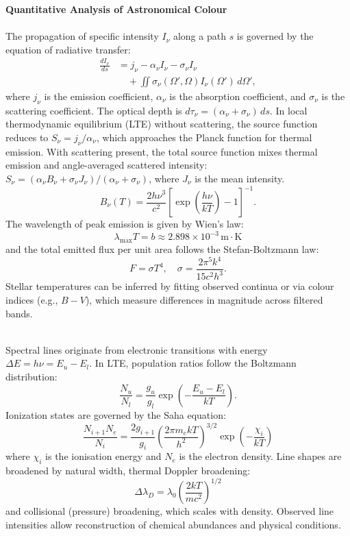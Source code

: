 \begin{technical}
{\Large\textbf{Quantitative Analysis of Astronomical Colour}}\\[0.3em]


\\[0.2em]
The propagation of specific intensity \( I_\nu \) along a path \( s \) is governed by the equation of radiative transfer:
\begin{align*}
\frac{dI_\nu}{ds} &= j_\nu - \alpha_\nu I_\nu - \sigma_\nu I_\nu \\
&\quad + \iint \sigma_\nu(\Omega', \Omega) I_\nu(\Omega')\, d\Omega',
\end{align*}
where \( j_\nu \) is the emission coefficient, \( \alpha_\nu \) is the absorption coefficient, and \( \sigma_\nu \) is the scattering coefficient. The optical depth is \( d\tau_\nu = (\alpha_\nu + \sigma_\nu)\, ds \). In local thermodynamic equilibrium (LTE) without scattering, the source function reduces to \( S_\nu = j_\nu/\alpha_\nu \), which approaches the Planck function for thermal emission. With scattering present, the total source function mixes thermal emission and angle-averaged scattered intensity: \( S_\nu = (\alpha_\nu B_\nu + \sigma_\nu J_\nu) / (\alpha_\nu + \sigma_\nu) \), where \( J_\nu \) is the mean intensity.
\[
B_\nu(T) = \frac{2h\nu^3}{c^2} \left[ \exp\left( \frac{h\nu}{kT} \right) - 1 \right]^{-1}.
\]
The wavelength of peak emission is given by Wien's law:
\[
\lambda_{\text{max}} T = b \approx 2.898 \times 10^{-3} \, \text{m} \cdot \text{K}
\]
and the total emitted flux per unit area follows the Stefan-Boltzmann law:
\[
F = \sigma T^4, \quad \sigma = \frac{2\pi^5 k^4}{15c^2 h^3}.
\]
Stellar temperatures can be inferred by fitting observed continua or via colour indices (e.g., \( B-V \)), which measure differences in magnitude across filtered bands.

\\[0.2em]
Spectral lines originate from electronic transitions with energy \( \Delta E = h\nu = E_u - E_l \). In LTE, population ratios follow the Boltzmann distribution:
\[
\frac{N_u}{N_l} = \frac{g_u}{g_l} \exp\left( -\frac{E_u - E_l}{kT} \right).
\]
Ionization states are governed by the Saha equation:
\[
\frac{N_{i+1} N_e}{N_i} = \frac{2 g_{i+1}}{g_i} \left( \frac{2\pi m_e kT}{h^2} \right)^{3/2} \exp\left( -\frac{\chi_i}{kT} \right)
\]
where \( \chi_i \) is the ionisation energy and \( N_e \) is the electron density. Line shapes are broadened by natural width, thermal Doppler broadening:
\[
\Delta \lambda_D = \lambda_0 \left( \frac{2kT}{mc^2} \right)^{1/2}
\]
and collisional (pressure) broadening, which scales with density. Observed line intensities allow reconstruction of chemical abundances and physical conditions.


\end{technical}
